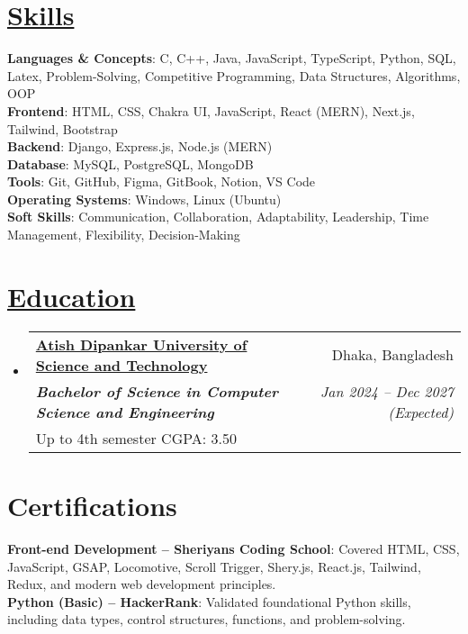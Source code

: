 \documentclass[a4paper,11pt]{article}
\makeatletter
\newcommand{\resumeSection}[2]{
  \section{\textbf{\href{#1}{#2}}}
}
\newcommand{\resumeEduSubheading}[6]{
  \vspace{-2pt}\item
    \begin{tabular*}{0.97\textwidth}[t]{l@{\extracolsep{\fill}}r}
      \textbf{\href{#1}{#2}} & #3 \\
      \textbf{\textit{\small #4}} & \textit{\small #5} \\
      {\small #6}
    \end{tabular*}\vspace{-7pt}
}
\newcommand{\resumeSubHeadingListStart}{\begin{itemize}[leftmargin=0.15in, label={}]}
\newcommand{\resumeSubHeadingListEnd}{\end{itemize}}
\makeatother
\begin{document}
\resumeSection{https://joyant.me/skills}{Skills}
 \begin{itemize}[leftmargin=0.15in, label={}]
    \small{\item{
     \textbf{Languages \& Concepts}{: C, C++, Java, JavaScript, TypeScript, Python, SQL, Latex, Problem-Solving, Competitive Programming, Data Structures, Algorithms, OOP} \\
     \textbf{Frontend}{: HTML, CSS, Chakra UI, JavaScript, React (MERN), Next.js, Tailwind, Bootstrap} \\
     \textbf{Backend}{: Django, Express.js, Node.js (MERN)} \\
     \textbf{Database}{: MySQL, PostgreSQL, MongoDB} \\
     \textbf{Tools}{: Git, GitHub, Figma, GitBook, Notion, VS Code} \\
     \textbf{Operating Systems}{: Windows, Linux (Ubuntu)} \\
     \textbf{Soft Skills}{: Communication, Collaboration, Adaptability, Leadership, Time Management, Flexibility, Decision-Making}
    }}
 \end{itemize}

\resumeSection{https://joyant.me/education}{Education}
  \resumeSubHeadingListStart
    \resumeEduSubheading
      {https://www.adust.edu.bd/\#}{Atish Dipankar University of Science and Technology}{Dhaka, Bangladesh}
      {Bachelor of Science in Computer Science and Engineering }{Jan 2024 -- Dec 2027 (Expected)}
      {Up to 4th semester CGPA: 3.50}
  \resumeSubHeadingListEnd

\section{\textbf{Certifications}}
  \begin{itemize}[leftmargin=0.15in, label={}]
    \small{\item{
      \textbf{Front-end Development – Sheriyans Coding School}{: Covered HTML, CSS, JavaScript, GSAP, Locomotive, Scroll Trigger, Shery.js, React.js, Tailwind, Redux, and modern web development principles.} \\
      \textbf{Python (Basic) – HackerRank}{: Validated foundational Python skills, including data types, control structures, functions, and problem-solving.}
    }}
  \end{itemize}

\end{document}
